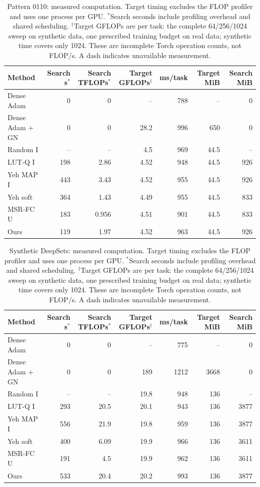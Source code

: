 \begin{table}[htbp]
\centering\small\setlength{\tabcolsep}{3.5pt}
\begin{tabular}{lrrrrrr}
\toprule
Method & Search s$^*$ & Search TFLOPs$^*$ & Target GFLOPs$^\dagger$ & ms/task & Target MiB & Search MiB\\
\midrule
Dense Adam & 0 & 0 & -- & 788 & -- & 0\\
Dense Adam + GN & 0 & 0 & 28.2 & 996 & 650 & 0\\
Random I & -- & -- & 4.5 & 969 & 44.5 & --\\
LUT-Q I & 198 & 2.86 & 4.52 & 948 & 44.5 & 926\\
Yeh MAP I & 443 & 3.43 & 4.52 & 955 & 44.5 & 926\\
Yeh soft & 364 & 1.43 & 4.49 & 955 & 44.5 & 833\\
MSR-FC U & 183 & 0.956 & 4.51 & 901 & 44.5 & 833\\
Ours & 119 & 1.97 & 4.52 & 963 & 44.5 & 926\\
\bottomrule\end{tabular}
\caption{Pattern 0110: measured computation. Target timing excludes the FLOP profiler and uses one process per GPU. $^*$Search seconds include profiling overhead and shared scheduling. $^\dagger$Target GFLOPs are per task: the complete 64/256/1024 sweep on synthetic data, one prescribed training budget on real data; synthetic time covers only 1024. These are incomplete Torch operation counts, not FLOP/s. A dash indicates unavailable measurement.}
\end{table}
\begin{table}[htbp]
\centering\small\setlength{\tabcolsep}{3.5pt}
\begin{tabular}{lrrrrrr}
\toprule
Method & Search s$^*$ & Search TFLOPs$^*$ & Target GFLOPs$^\dagger$ & ms/task & Target MiB & Search MiB\\
\midrule
Dense Adam & 0 & 0 & -- & 775 & -- & 0\\
Dense Adam + GN & 0 & 0 & 189 & 1212 & 3668 & 0\\
Random I & -- & -- & 19.8 & 948 & 136 & --\\
LUT-Q I & 293 & 20.5 & 20.1 & 943 & 136 & 3877\\
Yeh MAP I & 556 & 21.9 & 19.8 & 959 & 136 & 3877\\
Yeh soft & 400 & 6.09 & 19.9 & 966 & 136 & 3611\\
MSR-FC U & 191 & 4.5 & 19.9 & 962 & 136 & 3611\\
Ours & 533 & 20.4 & 20.2 & 993 & 136 & 3877\\
\bottomrule\end{tabular}
\caption{Synthetic DeepSets: measured computation. Target timing excludes the FLOP profiler and uses one process per GPU. $^*$Search seconds include profiling overhead and shared scheduling. $^\dagger$Target GFLOPs are per task: the complete 64/256/1024 sweep on synthetic data, one prescribed training budget on real data; synthetic time covers only 1024. These are incomplete Torch operation counts, not FLOP/s. A dash indicates unavailable measurement.}
\end{table}
